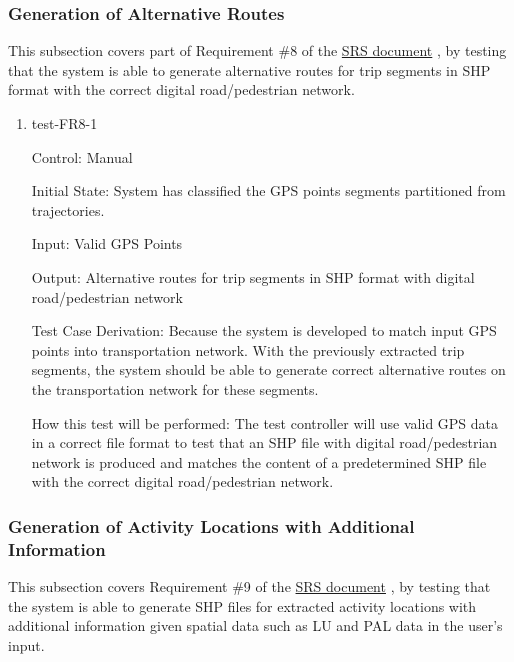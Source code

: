 \documentclass[12pt, titlepage]{article}
\begin{document}
\subsubsection{Generation of Alternative Routes}

This subsection covers part of Requirement \#8 of the \href{https://github.com/paezha/PyERT-BLACK/blob/main/docs/SRS/SRS.pdf}{SRS document} \citep{SRS}, by testing that the system is able to generate alternative routes for trip segments in SHP format with the correct digital road/pedestrian network.

\begin{enumerate}

\item{test-FR8-1\\} \label{test-FR8-1}

Control: Manual 
					
Initial State: System has classified the GPS points segments partitioned from trajectories.
					
Input: Valid GPS Points
					
Output: Alternative routes for trip segments in SHP format with digital road/pedestrian network

Test Case Derivation: Because the system is developed to match input GPS points into transportation network. With the previously extracted trip segments, the system should be able to generate correct alternative routes on the transportation network for these segments.
					
How this test will be performed: The test controller will use valid GPS data in a correct file format to test that an SHP file with digital road/pedestrian network is produced and matches the content of a predetermined SHP file with the correct digital road/pedestrian network.

\end{enumerate}

\subsubsection{Generation of Activity Locations with Additional Information}

This subsection covers Requirement \#9 of the \href{https://github.com/paezha/PyERT-BLACK/blob/main/docs/SRS/SRS.pdf}{SRS document} \citep{SRS}, by testing that the system is able to generate SHP files for extracted activity locations with additional information given spatial data such as LU and PAL data in the user's input.
\end{document}
